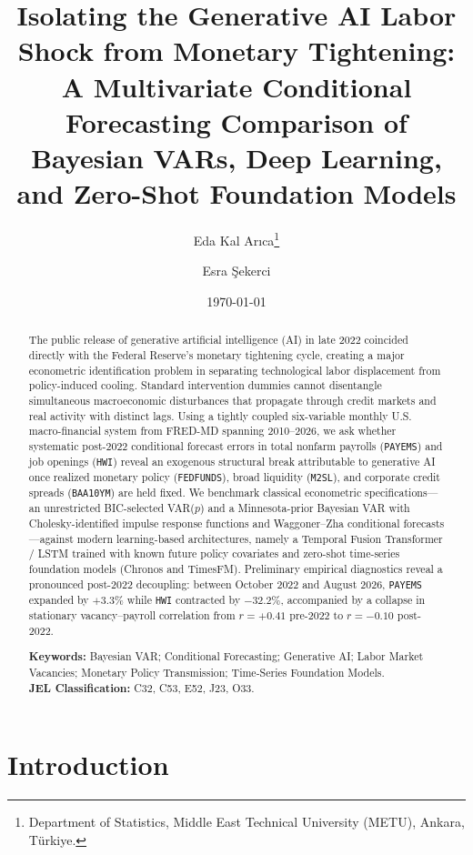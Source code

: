 \documentclass[11pt,a4paper]{article}
\title{\textbf{Isolating the Generative AI Labor Shock from Monetary Tightening:} \\
\large A Multivariate Conditional Forecasting Comparison of Bayesian VARs, Deep Learning, and Zero-Shot Foundation Models}
\author{
  Eda Kal Ar{\i}ca\thanks{Department of Statistics, Middle East Technical University (METU), Ankara, T{\"u}rkiye.}
  \and
  Esra {\c{S}}ekerci\footnotemark[1]
}
\date{\today}
\begin{document}
\maketitle

\begin{abstract}
\noindent
The public release of generative artificial intelligence (AI) in late 2022 coincided directly with the Federal Reserve's monetary tightening cycle, creating a major econometric identification problem in separating technological labor displacement from policy-induced cooling. Standard intervention dummies cannot disentangle simultaneous macroeconomic disturbances that propagate through credit markets and real activity with distinct lags. Using a tightly coupled six-variable monthly U.S. macro-financial system from FRED-MD spanning 2010--2026, we ask whether systematic post-2022 conditional forecast errors in total nonfarm payrolls (\texttt{PAYEMS}) and job openings (\texttt{HWI}) reveal an exogenous structural break attributable to generative AI once realized monetary policy (\texttt{FEDFUNDS}), broad liquidity (\texttt{M2SL}), and corporate credit spreads (\texttt{BAA10YM}) are held fixed. We benchmark classical econometric specifications---an unrestricted BIC-selected VAR($p$) and a Minnesota-prior Bayesian VAR with Cholesky-identified impulse response functions and Waggoner--Zha conditional forecasts---against modern learning-based architectures, namely a Temporal Fusion Transformer / LSTM trained with known future policy covariates and zero-shot time-series foundation models (Chronos and TimesFM). Preliminary empirical diagnostics reveal a pronounced post-2022 decoupling: between October 2022 and August 2026, \texttt{PAYEMS} expanded by $+3.3\%$ while \texttt{HWI} contracted by $-32.2\%$, accompanied by a collapse in stationary vacancy--payroll correlation from $r = +0.41$ pre-2022 to $r = -0.10$ post-2022.

\vspace{0.6em}
\noindent\textbf{Keywords:} Bayesian VAR; Conditional Forecasting; Generative AI; Labor Market Vacancies; Monetary Policy Transmission; Time-Series Foundation Models.\\
\textbf{JEL Classification:} C32, C53, E52, J23, O33.
\end{abstract}

\section{Introduction}
\label{sec:intro}
\end{document}
